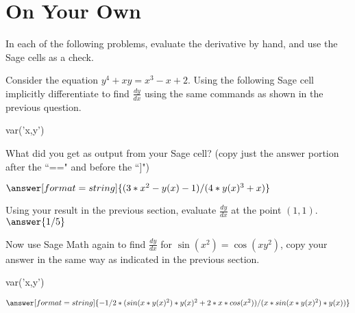 \documentclass{ximera}
\begin{document}
\section{On Your Own}
In each of the following problems, evaluate the derivative by hand, and use the Sage cells as a check.

Consider the equation $y^4+xy=x^3-x+2$. Using the following Sage cell implicitly differentiate to find $\frac{dy}{dx}$ using the same commands as shown in the previous question.
\begin{onlineOnly}
\begin{sageCell}
var('x,y')
\end{sageCell}
\end{onlineOnly}
\begin{question}
What did you get as output from your Sage cell? (copy just the answer portion after the ``==" and before the ``]")

$\answer[format=string]{(3*x^2 - y(x) - 1)/(4*y(x)^3 + x)}$
\end{question}
\begin{question}
Using your result in the previous section, evaluate $\frac{dy}{dx}$ at the point $(1,1)$.
$\answer{1/5}$
\end{question}
\begin{question}
Now use Sage Math again to find $\frac{dy}{dx}$ for  $\sin(x^2)=\cos(xy^2)$, copy your answer in the same way as indicated in the previous section.
\begin{onlineOnly}
\begin{sageCell}
var('x,y')
\end{sageCell}
\end{onlineOnly}
$\answer[format=string]{-1/2*(sin(x*y(x)^2)*y(x)^2 + 2*x*cos(x^2))/(x*sin(x*y(x)^2)*y(x))}$
\end{question}
\end{document}
